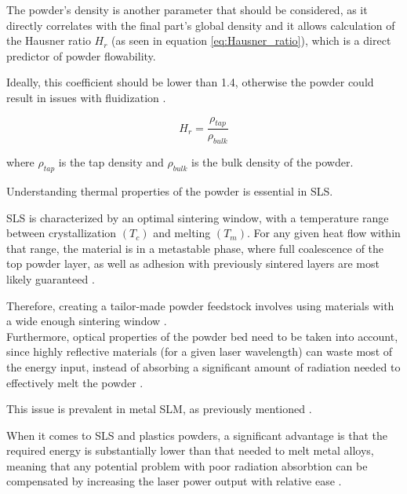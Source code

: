 \documentclass{article}
\begin{document}
    The powder's density is another parameter that should be considered, as it directly correlates with the final part's 
    global density and it allows calculation of the Hausner ratio $H_r$ (as seen in equation \ref{eq:Hausner_ratio}), which is a direct predictor of powder flowability. 
    
    Ideally, this coefficient should be lower than 1.4, otherwise the powder could result in issues with fluidization \autocite*{doi:10.1063/1.4918516}. 

    \begin{equation}
        H_r = \frac{\rho_{tap}}{\rho_{bulk}}
        \label{eq:Hausner_ratio}
    \end{equation} 

    where $\rho_{tap}$ is the tap density and $\rho_{bulk}$ is the bulk density of the powder. 

    \clearpage



    Understanding thermal properties of the powder is essential in SLS. 


    SLS is characterized by an optimal sintering window, with a temperature range between
    crystallization $(T_c)$ and melting $(T_m)$. 
    For any given heat flow within that range, the material is in a metastable phase, 
    where full coalescence of the top powder layer, as well as adhesion with previously sintered layers are 
    most likely guaranteed \autocite{doi:10.1063/1.4918516}. 

    Therefore, creating a tailor-made powder feedstock involves using materials with a wide enough 
    sintering window \autocites*{DechetMaximilianA2020OtDo}{doi:10.1063/1.4918516}. \\

    Furthermore, optical properties of the powder bed need to be taken into account, since highly reflective materials (for a given 
    laser wavelength) can waste most of the energy input, instead of absorbing a significant amount of radiation needed to 
    effectively melt the powder \autocite{doi:10.1063/1.4918516}.  

    This issue is prevalent in metal SLM, as previously mentioned \autocites{doi:10.1063/1.4918516, Latvian_additive}. 
    
    When it comes to SLS and plastics powders, a significant advantage is that the required energy is substantially lower than that needed to melt metal alloys, 
    meaning that any potential problem with poor radiation absorbtion can be compensated by increasing the 
    laser power output with relative ease \autocite{doi:10.1063/1.4918516}. \\ 
    
\end{document}
